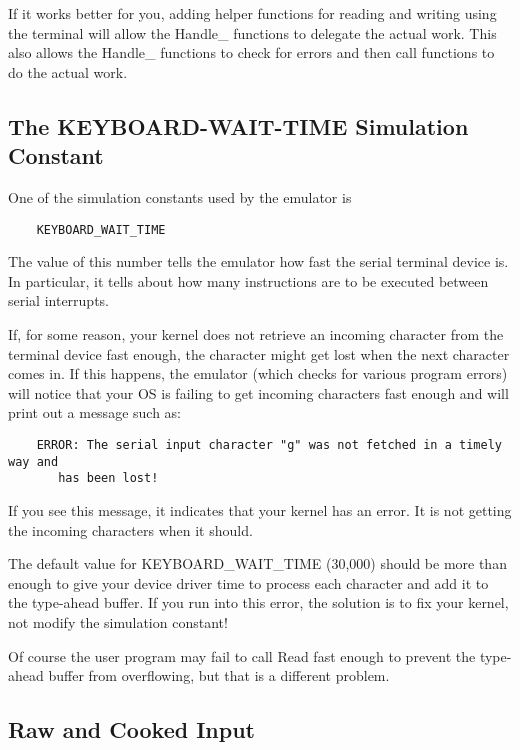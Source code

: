\documentclass[11pt]{article}
\begin{document}
If it works better for you, adding helper functions for reading
and writing using the terminal will allow the Handle\_ functions
to delegate the actual work.  This also allows the Handle\_
functions to check for errors and then call functions to do
the actual work.

\subsection{The KEYBOARD-WAIT-TIME Simulation Constant}

One of the simulation constants used by the emulator is

\begin{verbatim}
    KEYBOARD_WAIT_TIME
\end{verbatim}

The value of this number tells the emulator how fast the serial
terminal device is.  In particular, it tells about how many
instructions are to be executed between serial interrupts.

If, for some reason, your kernel does not retrieve an incoming
character from the terminal device fast enough, the character might
get lost when the next character comes in.  If this happens, the
emulator (which checks for various program errors) will notice that
your OS is failing to get incoming characters fast enough and will
print out a message such as:

\begin{verbatim}
    ERROR: The serial input character "g" was not fetched in a timely way and
       has been lost!
\end{verbatim}

If you see this message, it indicates that your kernel has an error.
It is not getting the incoming characters when it should.

The default value for KEYBOARD\_WAIT\_TIME (30,000) should be more than
enough to give your device driver time to process each character and
add it to the type-ahead buffer.  If you run into this error, the
solution is to fix your kernel, not modify the simulation constant!

Of course the user program may fail to call Read fast enough to
prevent the type-ahead buffer from overflowing, but that is a
different problem.

\subsection{Raw and Cooked Input}
\end{document}
